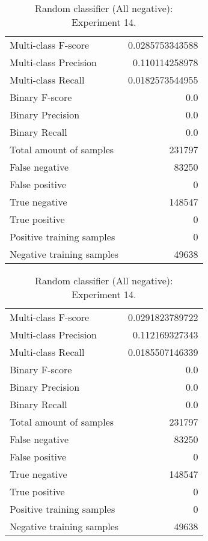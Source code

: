 \begin{table}[H]
\begin{minipage}{0.5\textwidth}
\caption{Random classifier (All negative): \\Experiment 13.}
\centering
\begin{tabular}{l r}
\toprule
Multi-class F-score & 0.0285753343588 \\
Multi-class Precision & 0.110114258978 \\
Multi-class Recall & 0.0182573544955 \\
\midrule
Binary F-score & 0.0 \\
Binary Precision & 0.0 \\
Binary Recall & 0.0 \\
\midrule
Total amount of samples & 231797 \\
False negative & 83250 \\
False positive & 0 \\
True negative & 148547 \\
True positive & 0 \\
\midrule
Positive training samples & 0 \\
Negative training samples & 49638 \\
\bottomrule
\end{tabular}
\end{minipage}
\hfillx
\begin{minipage}{0.5\textwidth}
\caption{Random classifier (All negative): \\Experiment 14.}
\centering
\begin{tabular}{l r}
\toprule
Multi-class F-score & 0.0291823789722 \\
Multi-class Precision & 0.112169327343 \\
Multi-class Recall & 0.0185507146339 \\
\midrule
Binary F-score & 0.0 \\
Binary Precision & 0.0 \\
Binary Recall & 0.0 \\
\midrule
Total amount of samples & 231797 \\
False negative & 83250 \\
False positive & 0 \\
True negative & 148547 \\
True positive & 0 \\
\midrule
Positive training samples & 0 \\
Negative training samples & 49638 \\
\bottomrule
\end{tabular}
\end{minipage}
\end{table}
